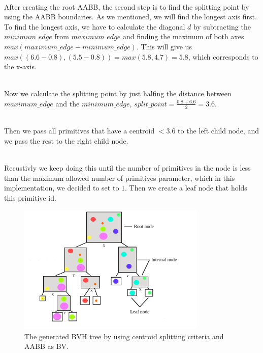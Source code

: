 \documentclass[11pt,a4paper]{article}
\begin{document}
\noindent
\\
After creating the root AABB, the second step is to find the splitting point by using the AABB boundaries. As we mentioned, we will find the longest axis first. To find the longest axis, we have to calculate the diagonal $d$ by subtracting the $minimum\_edge$ from $maximum\_edge $ and finding the maximum of both axes $max(maximum\_edge - minimum\_edge)$. This will give us $max((6.6-0.8) , (5.5-0.8)) = max(5.8,4.7) = 5.8$, which corresponds to the x-axis. 

\noindent
\\
Now we calculate the splitting point by just halfing the distance between $maximum\_edge $ and the $minimum\_edge$, $split\_point = \frac{0.8+6.6}{2} = 3.6$.

\noindent
\\
Then we pass all primitives that have a centroid $ < 3.6$ to the left child node, and we pass the rest to the right child node.  

\noindent
\\
Recustivly we keep doing this until the number of primitives in the node is less than the maximum allowed number of primitives parameter, which in this implementation, we decided to set to $1$. Then we create a leaf node that holds this primitive id. 


\begin{figure}[h]	
     \centering
     \captionsetup{justification=centering,margin=2cm}
     \includegraphics[width=9cm]{images/example_bvh/tree.png}
     \caption{The generated BVH tree by using centroid splitting criteria and AABB as BV.}
     \label{fig:dice}
\end{figure}
\end{document}

